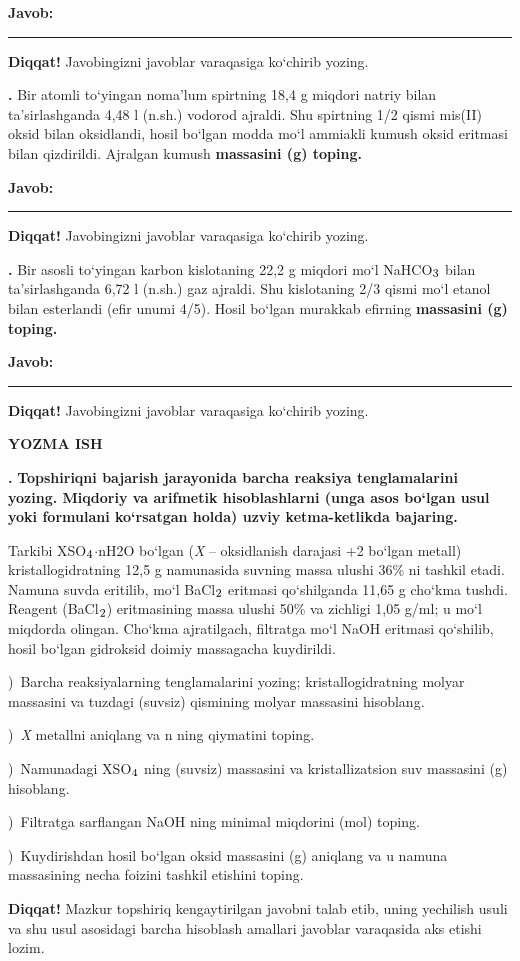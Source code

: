 \documentclass[11pt,a4paper]{article}
\renewcommand{\textsubscript}[1]{\ensuremath{_{\text{\fontsize{8}{8}\selectfont #1}}}}
\newcommand{\qn}[1]{\textbf{\fontsize{11.5}{13}\selectfont #1}}
\newcommand{\qsep}{\par\vspace{13pt}}
\newcommand{\diqqat}[1]{\par\smallskip\noindent\textbf{Diqqat!} #1\par\medskip}
\newcommand{\javob}{\par\nopagebreak[4]\smallskip\noindent\textbf{Javob:} \rule[-2pt]{7.5cm}{0.4pt}\par\smallskip\noindent\textbf{Diqqat!} Javobingizni javoblar varaqasiga ko`chirib yozing.\par\medskip}
\begin{document}
\javob\qsep
\noindent\qn{39.} Bir atomli to`yingan noma'lum spirtning 18,4 g miqdori natriy bilan ta'sirlashganda 4,48 l (n.sh.) vodorod ajraldi. Shu spirtning 1/2 qismi mis(II) oksid bilan oksidlandi, hosil bo`lgan modda mo`l ammiakli kumush oksid eritmasi bilan qizdirildi. Ajralgan kumush \textbf{massasini (g) toping.}
\javob\qsep
\noindent\qn{40.} Bir asosli to`yingan karbon kislotaning 22,2 g miqdori mo`l NaHCO\textsubscript{3} bilan ta'sirlashganda 6,72 l (n.sh.) gaz ajraldi. Shu kislotaning 2/3 qismi mo`l etanol bilan esterlandi (efir unumi 4/5). Hosil bo`lgan murakkab efirning \textbf{massasini (g) toping.}
\javob\qsep
\par\bigskip\begin{center}\textbf{\fontsize{13}{15}\selectfont YOZMA ISH}\end{center}
\noindent\qn{41.} \textbf{Topshiriqni bajarish jarayonida barcha reaksiya tenglamalarini yozing. Miqdoriy va arifmetik hisoblashlarni (unga asos bo`lgan usul yoki formulani ko`rsatgan holda) uzviy ketma-ketlikda bajaring.}\par\smallskip
Tarkibi XSO\textsubscript{4}$\cdot$nH2O bo`lgan (\textit{X} -- oksidlanish darajasi +2 bo`lgan metall) kristallogidratning 12,5 g namunasida suvning massa ulushi 36\% ni tashkil etadi. Namuna suvda eritilib, mo`l BaCl\textsubscript{2} eritmasi qo`shilganda 11,65 g cho`kma tushdi. Reagent (BaCl\textsubscript{2}) eritmasining massa ulushi 50\% va zichligi 1,05 g/ml; u mo`l miqdorda olingan. Cho`kma ajratilgach, filtratga mo`l NaOH eritmasi qo`shilib, hosil bo`lgan gidroksid doimiy massagacha kuydirildi.\par
{})\ Barcha reaksiyalarning tenglamalarini yozing; kristallogidratning molyar massasini va tuzdagi (suvsiz) qismining molyar massasini hisoblang.\par
{})\ \textit{X} metallni aniqlang va n ning qiymatini toping.\par
{})\ Namunadagi XSO\textsubscript{4} ning (suvsiz) massasini va kristallizatsion suv massasini (g) hisoblang.\par
{})\ Filtratga sarflangan NaOH ning minimal miqdorini (mol) toping.\par
{})\ Kuydirishdan hosil bo`lgan oksid massasini (g) aniqlang va u namuna massasining necha foizini tashkil etishini toping.\par
\diqqat{Mazkur topshiriq kengaytirilgan javobni talab etib, uning yechilish usuli va shu usul asosidagi barcha hisoblash amallari javoblar varaqasida aks etishi lozim.}\qsep
\end{document}
